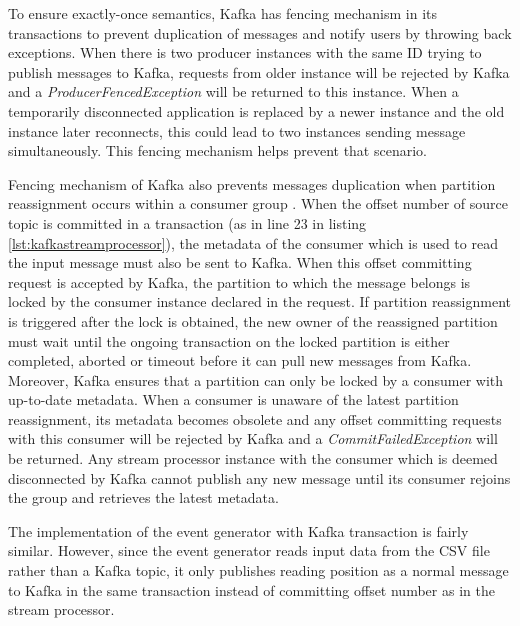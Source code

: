  

To ensure exactly-once semantics, Kafka has fencing mechanism in its transactions to prevent duplication of messages and notify users by throwing back exceptions. When there is two producer instances with the same ID trying to publish messages to Kafka, requests from older instance will be rejected by Kafka and a \emph{ProducerFencedException} will be returned to this instance. When a temporarily disconnected application is replaced by a newer instance and the old instance later reconnects, this could lead to two instances sending message simultaneously. This fencing mechanism helps prevent that scenario. 

Fencing mechanism of Kafka also prevents messages duplication when partition reassignment occurs within a consumer group \cite{kafkatransctionscaleproducer}. When the offset number of source topic is committed in a transaction (as in line 23 in listing \ref{lst:kafkastreamprocessor}), the metadata of the consumer which is used to read the input message must also be sent to Kafka. When this offset committing request is accepted by Kafka, the partition to which the message belongs is locked by the consumer instance declared in the request. If partition reassignment is triggered after the lock is obtained, the new owner of the reassigned partition must wait until the ongoing transaction on the locked partition is either completed, aborted or timeout before it can pull new messages from Kafka. Moreover, Kafka ensures that a partition can only be locked by a consumer with up-to-date metadata. When a consumer is unaware of the latest partition reassignment, its metadata becomes obsolete and any offset committing requests with this consumer will be rejected by Kafka and a \emph{CommitFailedException} will be returned. Any stream processor instance with the consumer which is deemed disconnected by Kafka cannot publish any new message until its consumer rejoins the group and retrieves the latest metadata.

The implementation of the event generator with Kafka transaction is fairly similar. However, since the event generator reads input data from the CSV file rather than a Kafka topic, it only publishes reading position as a normal message to Kafka in the same transaction instead of committing offset number as in the stream processor.

